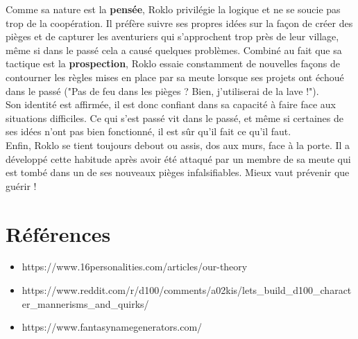 \documentclass{article}
\begin{document}
Comme sa nature est la \textbf{pensée}, Roklo privilégie la logique et ne se soucie pas trop de la coopération. Il préfère suivre ses propres idées sur la façon de créer des pièges et de capturer les aventuriers qui s'approchent trop près de leur village, même si dans le passé cela a causé quelques problèmes. Combiné au fait que sa tactique est la \textbf{prospection}, Roklo essaie constamment de nouvelles façons de contourner les règles mises en place par sa meute lorsque ses projets ont échoué dans le passé ("Pas de feu dans les pièges ? Bien, j'utiliserai de la lave !").\\

Son identité est affirmée, il est donc confiant dans sa capacité à faire face aux situations difficiles. Ce qui s'est passé vit dans le passé, et même si certaines de ses idées n'ont pas bien fonctionné, il est sûr qu'il fait ce qu'il faut.\\

Enfin, Roklo se tient toujours debout ou assis, dos aux murs, face à la porte. Il a développé cette habitude après avoir été attaqué par un membre de sa meute qui est tombé dans un de ses nouveaux pièges infalsifiables. Mieux vaut prévenir que guérir !

\section*{Références}
\begin{itemize}
	\item https://www.16personalities.com/articles/our-theory
	\item  https://www.reddit.com/r/d100/comments/a02kis/lets\_build\_d100\_character\_mannerisms\_and\_quirks/
	\item https://www.fantasynamegenerators.com/
\end{itemize}
\end{document}
